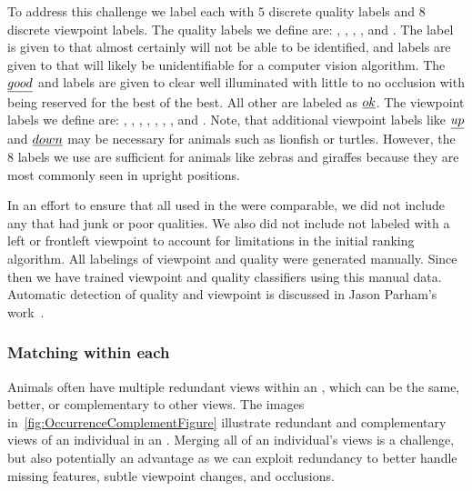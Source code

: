             To address this challenge we label each \annot{} with $5$ discrete quality labels and $8$ discrete viewpoint
            labels. The quality labels we define are: \qualJunk{}, \qualPoor{}, \qualOk{}, \qualGood{}, and
            \qualExcellent{}. The \qualJunk{} label is given to \annots{} that almost certainly will not be able to be
            identified, and \qualPoor{} labels are given to \annots{} that will likely be unidentifiable for a computer
            vision algorithm. The $\emph{good}{}$ and \qualExcellent{} labels are given to clear well illuminated
            \annots{} with little to no occlusion with \qualExcellent{} being reserved for the best of the best. All
            other \annots{} are labeled as $\emph{ok}$. The viewpoint labels we define are: \vpFront{}, \vpFrontLeft{},
            \vpLeft{}, \vpBackLeft{}, \vpBack{}, \vpBackRight{}, \vpBack{}, and \vpFrontRight{}. Note, that additional
            viewpoint labels like $\emph{up}{}$ and $\emph{down}{}$ may be necessary for animals such as lionfish or turtles.
            However, the $8$ labels we use are sufficient for animals like zebras and giraffes because they are most
            commonly seen in upright positions.

            In an effort to ensure that all \annots{} used in the \GZC{} were comparable, we did not include any
            \annot{} that had junk or poor qualities. We also did not include \annots{} not labeled with a left or
            frontleft viewpoint to account for limitations in the initial ranking algorithm. All labelings of viewpoint
            and quality were generated manually. Since then we have trained viewpoint and quality classifiers using this
            manual data. Automatic detection of quality and viewpoint is discussed in Jason Parham's
            work~\cite{parham_photographic_2015}.

        \subsubsection{Matching within each \occurrence{}} %
            Animals often have multiple redundant views within an \occurrence{}, which can be the same, better, or
            complementary to other views. The images in~\cref{fig:OccurrenceComplementFigure} illustrate redundant and
            complementary views of an individual in an \occurrence{}. Merging all of an individual's views is a
            challenge, but also potentially an advantage as we can exploit redundancy to better handle missing features,
            subtle viewpoint changes, and occlusions.

